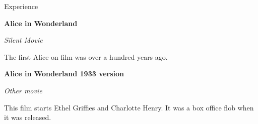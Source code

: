 \begin{rubric}{Experience}

    \textbf{Alice in Wonderland}\hfill
    \par
    \textit{Silent Movie}\par
    The first Alice on film was over a hundred years ago.

    \textbf{Alice in Wonderland 1933 version}\hfill
    \par
    \textit{Other movie}\par
    This film starts Ethel Griffies and Charlotte Henry. It was a box
    office flob when it was released.
\end{rubric}
